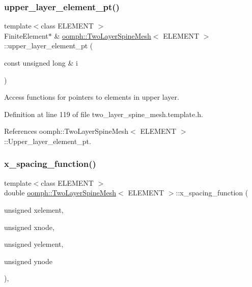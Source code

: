 \subsubsection{\texorpdfstring{upper\+\_\+layer\+\_\+element\+\_\+pt()}{upper\_layer\_element\_pt()}}
{\footnotesize\ttfamily template$<$class E\+L\+E\+M\+E\+NT $>$ \\
Finite\+Element$\ast$ \& \hyperlink{classoomph_1_1TwoLayerSpineMesh}{oomph\+::\+Two\+Layer\+Spine\+Mesh}$<$ E\+L\+E\+M\+E\+NT $>$\+::upper\+\_\+layer\+\_\+element\+\_\+pt (\begin{DoxyParamCaption}\item[{const unsigned long \&}]{i }\end{DoxyParamCaption})\hspace{0.3cm}{\ttfamily [inline]}}



Access functions for pointers to elements in upper layer. 



Definition at line 119 of file two\+\_\+layer\+\_\+spine\+\_\+mesh.\+template.\+h.



References oomph\+::\+Two\+Layer\+Spine\+Mesh$<$ E\+L\+E\+M\+E\+N\+T $>$\+::\+Upper\+\_\+layer\+\_\+element\+\_\+pt.

\mbox{\label{classoomph_1_1TwoLayerSpineMesh_a5fd9eae27ba19788e0b397936f0c5ead}} 
\subsubsection{\texorpdfstring{x\+\_\+spacing\+\_\+function()}{x\_spacing\_function()}}
{\footnotesize\ttfamily template$<$class E\+L\+E\+M\+E\+NT $>$ \\
double \hyperlink{classoomph_1_1TwoLayerSpineMesh}{oomph\+::\+Two\+Layer\+Spine\+Mesh}$<$ E\+L\+E\+M\+E\+NT $>$\+::x\+\_\+spacing\+\_\+function (\begin{DoxyParamCaption}\item[{unsigned}]{xelement,  }\item[{unsigned}]{xnode,  }\item[{unsigned}]{yelement,  }\item[{unsigned}]{ynode }\end{DoxyParamCaption})\hspace{0.3cm}{\ttfamily [protected]}, {\ttfamily [virtual]}}




